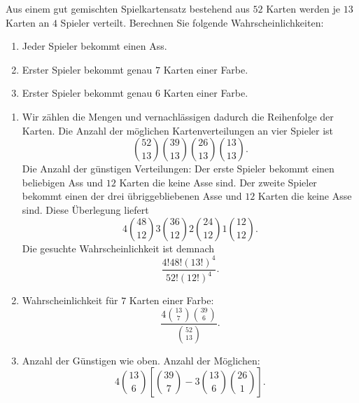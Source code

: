  Aus einem gut gemischten Spielkartensatz
bestehend aus $52$ Karten werden je $13$ Karten an $4$ Spieler verteilt.
Berechnen Sie folgende Wahrscheinlichkeiten:
\begin{enumerate}
    \item Jeder Spieler bekommt einen Ass. 
    \item Erster Spieler bekommt genau $7$ Karten einer Farbe.
    \item Erster Spieler bekommt genau $6$ Karten einer Farbe.
\end{enumerate}

\solution 
\begin{enumerate}
    \item Wir zählen die Mengen und vernachlässigen dadurch die Reihenfolge der Karten.
        Die Anzahl der möglichen Kartenverteilungen an vier Spieler ist 
        \begin{equation*}
            \binom{52}{13}\binom{39}{13}\binom{26}{13}\binom{13}{13}.
        \end{equation*}
        Die Anzahl der günstigen Verteilungen: Der erste Spieler bekommt einen beliebigen
        Ass und $12$ Karten die keine Asse sind. Der zweite Spieler bekommt einen der drei
        übriggebliebenen Asse und $12$ Karten die keine Asse sind. Diese Überlegung liefert
        \begin{equation*}
            4 \binom{48}{12} 3 \binom{36}{12} 2 \binom{24}{12} 1 \binom{12}{12}.
        \end{equation*}
        Die gesuchte Wahrscheinlichkeit ist demnach
        \begin{equation*}
            \frac{4! 48!  \left( 13! \right)^4}{ 52! \left( 12! \right)^4 }. 
        \end{equation*}
    \item Wahrscheinlichkeit für $7$ Karten einer Farbe:
        \begin{equation*}
            \frac{4 \binom{13}{7} \binom{39}{6}}{ \binom{52}{13}}.
        \end{equation*}
    \item Anzahl der Günstigen wie oben. Anzahl der Möglichen:
        \begin{equation*}
            4 \binom{13}{6} \left[ \binom{39}{7} - 3 \binom{13}{6} \binom{26}{1}  \right].
        \end{equation*}
\end{enumerate}

